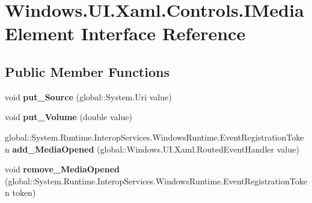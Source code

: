 \hypertarget{interface_windows_1_1_u_i_1_1_xaml_1_1_controls_1_1_i_media_element}{}\section{Windows.\+U\+I.\+Xaml.\+Controls.\+I\+Media\+Element Interface Reference}
\label{interface_windows_1_1_u_i_1_1_xaml_1_1_controls_1_1_i_media_element}
\subsection*{Public Member Functions}
\begin{DoxyCompactItemize}
\item 
\mbox{\label{interface_windows_1_1_u_i_1_1_xaml_1_1_controls_1_1_i_media_element_a9ccfe5f23b86ca54424f89ee8816be21}} 
void {\bfseries put\+\_\+\+Source} (global\+::\+System.\+Uri value)
\item 
\mbox{\label{interface_windows_1_1_u_i_1_1_xaml_1_1_controls_1_1_i_media_element_a499a56726198bd3a2e13da7fdaea8eb4}} 
void {\bfseries put\+\_\+\+Volume} (double value)
\item 
\mbox{\label{interface_windows_1_1_u_i_1_1_xaml_1_1_controls_1_1_i_media_element_af710ba32e5c086d5646e1a61e3a2bbaf}} 
global\+::\+System.\+Runtime.\+Interop\+Services.\+Windows\+Runtime.\+Event\+Registration\+Token {\bfseries add\+\_\+\+Media\+Opened} (global\+::\+Windows.\+U\+I.\+Xaml.\+Routed\+Event\+Handler value)
\item 
\mbox{\label{interface_windows_1_1_u_i_1_1_xaml_1_1_controls_1_1_i_media_element_ab974c092f3afe5c2c6eb21871e35d724}} 
void {\bfseries remove\+\_\+\+Media\+Opened} (global\+::\+System.\+Runtime.\+Interop\+Services.\+Windows\+Runtime.\+Event\+Registration\+Token token)
\item 
\mbox{\label{interface_windows_1_1_u_i_1_1_xaml_1_1_controls_1_1_i_media_element_a190c35f36005ac4360bc442c58c24107}} 

\end{DoxyCompactItemize}
